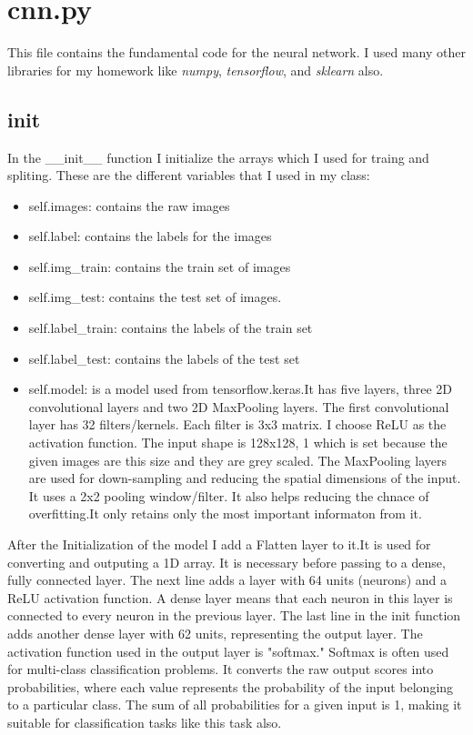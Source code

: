 \documentclass[11pt,a4paper,oneside]{report}
\begin{document}
\section{cnn.py}

This file contains the fundamental code for the neural network. I used many other libraries for my homework like \emph{numpy}, \emph{tensorflow}, and \emph{sklearn} also.

\subsection{init}
In the \_\_init\_\_ function I initialize the arrays which I used for traing and spliting. These are the different variables that I used in my class:
\begin{itemize}
  \item self.images: contains the raw images
  \item self.label: contains the labels for the images
  \item self.img\_train: contains the train set of images
  \item self.img\_test: contains the test set of images.
  \item self.label\_train: contains the labels of the train set
  \item self.label\_test: contains the labels of the test set
  \item self.model: is a model used from tensorflow.keras.It has five layers, three 2D convolutional layers  and two 2D MaxPooling layers.
        The first convolutional layer has 32 filters/kernels. Each filter is 3x3 matrix. I choose ReLU as the activation function.
        The input shape is 128x128, 1 which is set because the given images are this size and they are grey scaled.
        The MaxPooling layers are used for down-sampling and reducing the spatial dimensions of the input.
        It uses a 2x2 pooling window/filter. It also helps reducing the chnace of overfitting.It only retains only the most important informaton from it.
\end{itemize}
After the Initialization of the model I add a Flatten layer to it.It is used for converting and outputing a 1D array.
It is necessary before passing to a dense, fully connected layer. The next line adds a layer with 64 units (neurons) and a ReLU activation function.
A dense layer means that each neuron in this layer is connected to every neuron in the previous layer. The last line in the init function adds another dense layer with 62 units, representing the output layer.
The activation function used in the output layer is "softmax." Softmax is often used for multi-class classification problems. It converts the raw output scores into probabilities, where each value represents the probability of the input belonging to a particular class.
The sum of all probabilities for a given input is 1, making it suitable for classification tasks like this task also.
\end{document}
